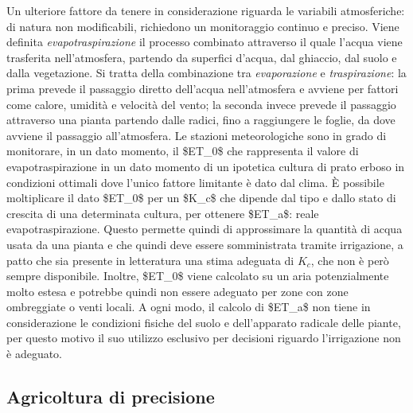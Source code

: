 \documentclass[12pt,a4paper,openright,twoside]{book}
\begin{document}
Un ulteriore fattore da tenere in considerazione riguarda le variabili atmosferiche: di natura non modificabili, richiedono un monitoraggio continuo e preciso. Viene definita \textit{evapotraspirazione} il processo combinato attraverso il quale l'acqua viene trasferita nell'atmosfera, partendo da superfici d'acqua, dal ghiaccio, dal suolo e dalla vegetazione\cite{Kirkham2014}. Si tratta della combinazione tra \textit{evaporazione} e \textit{traspirazione}: la prima prevede il passaggio diretto dell'acqua nell'atmosfera e avviene per fattori come calore, umidità e velocità del vento; la seconda invece prevede il passaggio attraverso una pianta partendo dalle radici, fino a raggiungere le foglie, da dove avviene il passaggio all'atmosfera.
Le stazioni meteorologiche\cite{Allen1998CropE} sono in grado di monitorare, in un dato momento, il \ac{$ET_0$} che rappresenta il valore di evapotraspirazione in un dato momento di un ipotetica cultura di prato erboso in condizioni ottimali dove l'unico fattore limitante è dato dal clima. È possibile moltiplicare il dato \ac{$ET_0$} per un \ac{$K_c$} che dipende dal tipo e dallo stato di crescita di una determinata cultura, per ottenere \ac{$ET_a$}: reale evapotraspirazione.
Questo permette quindi di approssimare la quantità di acqua usata da una pianta e che quindi deve essere somministrata tramite irrigazione, a patto che sia presente in letteratura una stima adeguata di $K_c$, che non è però sempre disponibile. Inoltre, \ac{$ET_0$} viene calcolato su un aria potenzialmente molto estesa e potrebbe quindi non essere adeguato per zone con zone ombreggiate o venti locali.
A ogni modo, il calcolo di \ac{$ET_a$} non tiene in considerazione le condizioni fisiche del suolo e dell'apparato radicale delle piante, per questo motivo il suo utilizzo esclusivo per decisioni riguardo l'irrigazione non è adeguato.

\subsection{Agricoltura di precisione}\label{agricoltura-precisione-tipi}
\end{document}
